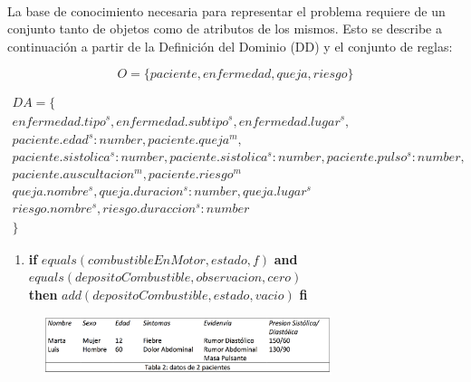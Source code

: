 \documentclass[10pt, a4paper,spanish]{article}
\begin{document}
		\paragraph{}
		La base de conocimiento necesaria para representar el problema requiere de un conjunto tanto de objetos como de atributos de los mismos. Esto se describe a continuación a partir de la Definición del Dominio (DD) y el conjunto de reglas:

		\begin{equation*}
			O = \{paciente, enfermedad, queja, riesgo \}
		\end{equation*}

		\begin{multline*}
			DA = \{ \\
				enfermedad.tipo^s, enfermedad.subtipo^s, enfermedad.lugar^s, \\
				paciente.edad^s:number, paciente.queja^m, \\
				paciente.sistolica^s:number, paciente.sistolica^s:number, paciente.pulso^s:number, \\
				paciente.auscultacion^m, paciente.riesgo^m \\
				queja.nombre^s, queja.duracion^s:number, queja.lugar^s\\
				riesgo.nombre^s, riesgo.duraccion^s:number\\
			\}
		\end{multline*}


		\begin{enumerate}[label={\textbf{R\theenumi:}}]

			\item
				\textbf{if} $equals(combustibleEnMotor, estado, f)$ \textbf{and} $equals(depositoCombustible, observacion, cero)$ \\
				\textbf{then} $add(depositoCombustible, estado, vacio)$ \textbf{fi}

		\end{enumerate}
		

		\begin{figure}[H]
			\begin{center}
				\includegraphics[width=0.75\textwidth]{table-2}
			\end{center}
		\end{figure}
\end{document}

